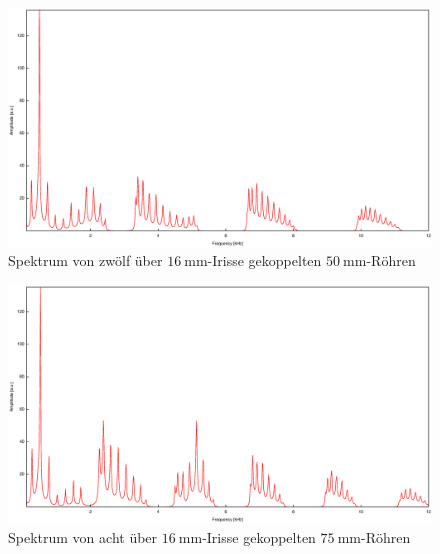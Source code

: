 \begin{figure}
\centering
\includegraphics[width=\linewidth-60pt,height=\textheight-60pt,keepaspectratio]{FP-V23data/4.4_600mm_16mm.eps}
\caption{Spektrum von zwölf über $\SI{16}{\milli\meter}$-Irisse gekoppelten $\SI{50}{\milli\meter}$-Röhren}
\label{fig:12_50_16}
\end{figure}
\begin{figure}
\centering
\includegraphics[width=\linewidth-60pt,height=\textheight-60pt,keepaspectratio]{FP-V23data/4.5_600mm_16mm.eps}
\caption{Spektrum von acht über $\SI{16}{\milli\meter}$-Irisse gekoppelten $\SI{75}{\milli\meter}$-Röhren}
\label{fig:8_75_16}
\end{figure}
